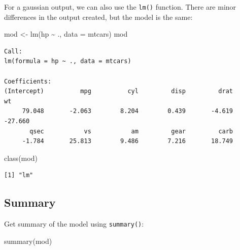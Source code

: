 \documentclass[
]{book}
\newenvironment{Shaded}{\begin{snugshade}}{\end{snugshade}}
\newcommand{\AttributeTok}[1]{\textcolor[rgb]{0.77,0.63,0.00}{#1}}
\newcommand{\FunctionTok}[1]{\textcolor[rgb]{0.00,0.00,0.00}{#1}}
\newcommand{\NormalTok}[1]{#1}
\newcommand{\OtherTok}[1]{\textcolor[rgb]{0.56,0.35,0.01}{#1}}
\newcommand{\SpecialCharTok}[1]{\textcolor[rgb]{0.00,0.00,0.00}{#1}}
\begin{document}
For a gaussian output, we can also use the \texttt{lm()} function. There are minor differences in the output created, but the model is the same:

\begin{Shaded}
\begin{Highlighting}[]
\NormalTok{mod }\OtherTok{\textless{}{-}} \FunctionTok{lm}\NormalTok{(hp }\SpecialCharTok{\textasciitilde{}}\NormalTok{ ., }\AttributeTok{data =}\NormalTok{ mtcars)}
\NormalTok{mod}
\end{Highlighting}
\end{Shaded}

\begin{verbatim}
Call:
lm(formula = hp ~ ., data = mtcars)

Coefficients:
(Intercept)          mpg          cyl         disp         drat           wt  
     79.048       -2.063        8.204        0.439       -4.619      -27.660  
       qsec           vs           am         gear         carb  
     -1.784       25.813        9.486        7.216       18.749  
\end{verbatim}

\begin{Shaded}
\begin{Highlighting}[]
\FunctionTok{class}\NormalTok{(mod)}
\end{Highlighting}
\end{Shaded}

\begin{verbatim}
[1] "lm"
\end{verbatim}

\hypertarget{summary-1}{%
\subsection{Summary}\label{summary-1}}

Get summary of the model using \texttt{summary()}:

\begin{Shaded}
\begin{Highlighting}[]
\FunctionTok{summary}\NormalTok{(mod)}
\end{Highlighting}
\end{Shaded}
\end{document}
